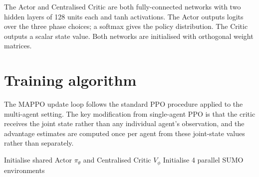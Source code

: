 \documentclass[11pt, a4paper]{report}
\begin{document}
The Actor and Centralised Critic are both fully-connected networks with two hidden layers of 128 units each and tanh activations. The Actor outputs logits over the three phase choices; a softmax gives the policy distribution. The Critic outputs a scalar state value. Both networks are initialised with orthogonal weight matrices.

\section{Training algorithm}

The MAPPO update loop follows the standard PPO procedure applied to the multi-agent setting. The key modification from single-agent PPO is that the critic receives the joint state rather than any individual agent's observation, and the advantage estimates are computed once per agent from these joint-state values rather than separately.

\begin{algorithm}[H]
\caption{MAPPO training loop (parameter sharing, centralised critic)}
\DontPrintSemicolon
Initialise shared Actor $\pi_\theta$ and Centralised Critic $V_\phi$\;
Initialise 4 parallel SUMO environments\;
\end{algorithm}
\end{document}
